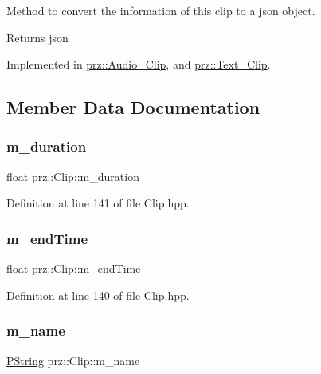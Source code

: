 Method to convert the information of this clip to a json object. 

\begin{DoxyReturn}{Returns}
json 
\end{DoxyReturn}


Implemented in \mbox{\hyperlink{classprz_1_1_audio___clip_a15fdef4e8547e25d06785d816be71a12}{prz\+::\+Audio\+\_\+\+Clip}}, and \mbox{\hyperlink{classprz_1_1_text___clip_a4e78e6e36c130ed42ec7f75772e3baed}{prz\+::\+Text\+\_\+\+Clip}}.



\subsection{Member Data Documentation}
\mbox{\label{classprz_1_1_clip_abf582141d0a2385e1ec2e94cc9eca70b}} 
\subsubsection{\texorpdfstring{m\_duration}{m\_duration}}
{\footnotesize\ttfamily float prz\+::\+Clip\+::m\+\_\+duration\hspace{0.3cm}{\ttfamily [protected]}}



Definition at line 141 of file Clip.\+hpp.

\mbox{\label{classprz_1_1_clip_abca99f03f5bc3963ee2c813b33a52d8e}} 
\subsubsection{\texorpdfstring{m\_endTime}{m\_endTime}}
{\footnotesize\ttfamily float prz\+::\+Clip\+::m\+\_\+end\+Time\hspace{0.3cm}{\ttfamily [protected]}}



Definition at line 140 of file Clip.\+hpp.

\mbox{\label{classprz_1_1_clip_a9480162480731a020244153ada1219aa}} 
\subsubsection{\texorpdfstring{m\_name}{m\_name}}
{\footnotesize\ttfamily \mbox{\hyperlink{classprz_1_1_p_string}{P\+String}} prz\+::\+Clip\+::m\+\_\+name\hspace{0.3cm}{\ttfamily [protected]}}



